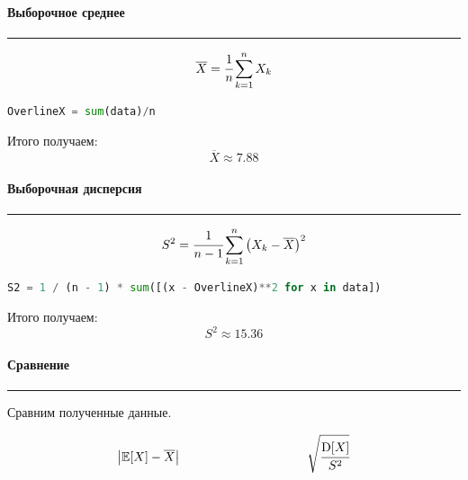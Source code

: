 \documentclass[a4paper, 14pt]{extarticle}
\begin{document}
\paragraph{Выборочное среднее}\vspace{-20pt}\rule{\linewidth}{0.1mm}

\begin{equation*}
  \overline{X} = \cfrac{1}{n} \sum_{k=1}^{n} X_k 
\end{equation*}

\begin{center}
  \begin{lstlisting}[language=Python]
OverlineX = sum(data)/n
  \end{lstlisting}
\end{center}
\vspace{10pt}
Итого получаем:
\begin{equation*}
  \overline{X} \approx 7.88
\end{equation*}

\paragraph{Выборочная дисперсия}\vspace{-20pt}\rule{\linewidth}{0.1mm}

\begin{equation*}
  S^2 = \cfrac{1}{n-1} \sum_{k=1}^{n} \left( X_k - \overline{X} \right)^2
\end{equation*}

\begin{center}
  \begin{lstlisting}[language=Python]
S2 = 1 / (n - 1) * sum([(x - OverlineX)**2 for x in data])
  \end{lstlisting}
\end{center}
\vspace{10pt}
Итого получаем:
\begin{equation*}
  S^2 \approx 15.36
\end{equation*}

\paragraph{Сравнение}\vspace{-20pt}\rule{\linewidth}{0.1mm}

Сравним полученные данные.

\begin{equation*}
  \left| \mathbb{E}[X] - \overline{X} \right| \hspace{100pt}
  \sqrt{\cfrac{\text{D}[X]}{S^2}}
\end{equation*}
\end{document}
